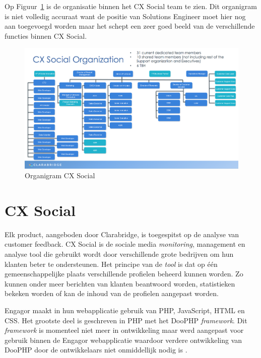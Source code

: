 Op Figuur~\ref{fig:Organigram} is de organisatie binnen het CX Social team te zien. Dit organigram is niet volledig accuraat want de positie van Solutions Engineer moet hier nog aan toegevoegd worden maar het schept een zeer goed beeld van de verschillende functies binnen CX Social. 

\begin{figure}[H]
	\centering
	\includegraphics[width=1\textwidth]{Figuren/Organigram.png}
	\caption{Organigram CX Social \cite{Jagrit}} 
	\label{fig:Organigram}
\end{figure} 

\section{CX Social} \label{CXSocial}
Elk product, aangeboden door Clarabridge, is toegespitst op de analyse van customer feedback. CX Social is de sociale media \textit{monitoring}, management en analyse tool die gebruikt wordt door verschillende grote bedrijven om hun klanten beter te ondersteunen. Het principe van de \textit{tool} is dat op \'{e}\'{e}n gemeenschappelijke plaats verschillende profielen beheerd kunnen worden. Zo kunnen onder meer berichten van klanten beantwoord worden, statistieken bekeken worden of kan de inhoud van de profielen aangepast worden. 

Engagor maakt in hun webapplicatie gebruik van PHP, JavaScript, HTML en CSS. Het grootste deel is geschreven in PHP met het DooPHP \textit{framework}. Dit \textit{framework} is momenteel niet meer in ontwikkeling maar werd aangepast voor gebruik binnen de Engagor webapplicatie waardoor verdere ontwikkeling van DooPHP door de ontwikkelaars niet onmiddellijk nodig is \cite{DooPHP}. %

